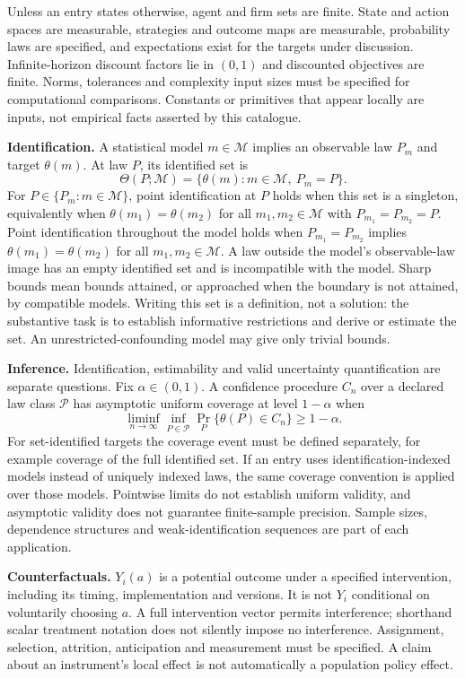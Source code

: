 \documentclass[11pt,a4paper]{article}
\begin{document}
Unless an entry states otherwise, agent and firm sets are finite. State and action spaces are measurable, strategies and outcome maps are measurable, probability laws are specified, and expectations exist for the targets under discussion. Infinite-horizon discount factors lie in $(0,1)$ and discounted objectives are finite. Norms, tolerances and complexity input sizes must be specified for computational comparisons. Constants or primitives that appear locally are inputs, not empirical facts asserted by this catalogue.

\textbf{Identification.} A statistical model $m\in\mathcal M$ implies an observable law $P_m$ and target $\theta(m)$. At law $P$, its identified set is
\[
\Theta(P;\mathcal M)=\{\theta(m):m\in\mathcal M,\ P_m=P\}.
\]
For $P\in\{P_m:m\in\mathcal M\}$, point identification at $P$ holds when this set is a singleton, equivalently when $\theta(m_1)=\theta(m_2)$ for all $m_1,m_2\in\mathcal M$ with $P_{m_1}=P_{m_2}=P$. Point identification throughout the model holds when $P_{m_1}=P_{m_2}$ implies $\theta(m_1)=\theta(m_2)$ for all $m_1,m_2\in\mathcal M$. A law outside the model's observable-law image has an empty identified set and is incompatible with the model. Sharp bounds mean bounds attained, or approached when the boundary is not attained, by compatible models. Writing this set is a definition, not a solution: the substantive task is to establish informative restrictions and derive or estimate the set. An unrestricted-confounding model may give only trivial bounds.

\textbf{Inference.} Identification, estimability and valid uncertainty quantification are separate questions. Fix $\alpha\in(0,1)$. A confidence procedure $C_n$ over a declared law class $\mathcal P$ has asymptotic uniform coverage at level $1-\alpha$ when
\[
\liminf_{n\to\infty}\inf_{P\in\mathcal P}\Pr_P\{\theta(P)\in C_n\}\geq1-\alpha.
\]
For set-identified targets the coverage event must be defined separately, for example coverage of the full identified set. If an entry uses identification-indexed models instead of uniquely indexed laws, the same coverage convention is applied over those models. Pointwise limits do not establish uniform validity, and asymptotic validity does not guarantee finite-sample precision. Sample sizes, dependence structures and weak-identification sequences are part of each application.

\textbf{Counterfactuals.} $Y_i(a)$ is a potential outcome under a specified intervention, including its timing, implementation and versions. It is not $Y_i$ conditional on voluntarily choosing $a$. A full intervention vector permits interference; shorthand scalar treatment notation does not silently impose no interference. Assignment, selection, attrition, anticipation and measurement must be specified. A claim about an instrument's local effect is not automatically a population policy effect.
\end{document}
